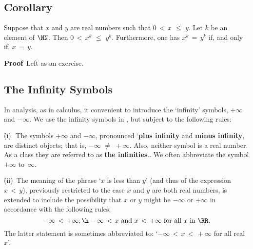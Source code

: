 \V
\V

            \subsection{\small{\bf Corollary}}
            \label{CorB20.61}

\V

\hspace*{\parindent}Suppose that $x$ and $y$ are real numbers such that $0\,<\,x\,\,{\leq}\,\,y$.
    Let $k$ be an element of ${\NN}$.
    Then $0\,<\,x^{k}\,\,{\leq}\,\,y^{k}$.
    Furthermore, one has $x^{k} \,=\, y^{k}$ if, and only if, $x \,=\, y$.

\V

        {\bf Proof}\, Left as an exercise.

\VV


            \subsection{\small{\bf The Infinity Symbols}}
            \label{RemrkB20.43}


        In analysis, as in calculus, it convenient to introduce the `infinity' symbols, $+{\infty}$ and $-{\infty}$.
    We use the infinity symbols in {\TheseNotes}, but subject to the following rules:

\VA

        \h (i)\,\, The symbols $+{\infty}$ and $-{\infty}$, pronounced `{\bf plus infinity} and {\bf minus infinity}, are distinct objects; that is, $-{\infty} \,\,{\neq}\,\, +{\infty}$. Also, neither symbol is a real number.
    As a class they are referred to as {\bf the infinities}.. We often abbreviate the symbol $+{\infty}$ to~${\infty}$.

\VA

        \h (ii)\, The meaning of the phrase `$x$ is less than $y$' (and thus of the expression $x\,<\,y$),
    previously restricted to the case $x$ and $y$ are both real numbers, is extended to include
    the possibility that $x$ or $y$ might be $-{\infty}$ or $+{\infty}$ in accordance with the following rules:
        \begin{displaymath}
        -{\infty}\,<\,+{\infty}; \h -{\infty}\,<\,x \mbox{ and } x\,<\,+{\infty} \mbox{ for all $x$ in ${\RR}$}.
        \end{displaymath}
    The latter statement is sometimes abbreviated to: `$-{\infty}\,<\,x\,<\,+{\infty}$ for all real~$x$'.

